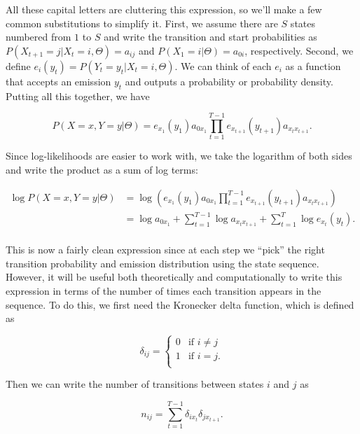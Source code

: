 All these capital letters are cluttering this expression, so we'll make a few common substitutions to simplify it. First, we assume there are $S$ states numbered from $1$ to $S$ and write the transition and start probabilities as $P(X_{t+1}=j|X_t=i, \Theta) = a_{ij}$ and $P(X_1=i|\Theta) = a_{0i}$, respectively. Second, we define $e_i(y_t) = P(Y_t=y_t|X_t=i, \Theta)$. We can think of each $e_i$ as a function that accepts an emission $y_t$ and outputs a probability or probability density. Putting all this together, we have

\begin{equation*}
P(X=x, Y=y|\Theta) = e_{x_1}(y_1)a_{0x_1} \prod_{t=1}^{T-1} e_{x_{t+1}}(y_{t+1}) a_{x_t x_{t+1}}.
\end{equation*}

Since log-likelihoods are easier to work with, we take the logarithm of both sides and write the product as a sum of log terms:

\begin{align*}
\log P(X=x, Y=y|\Theta)
&= \log \left( e_{x_1}(y_1)a_{0x_1} \prod_{t=1}^{T-1} e_{x_{t+1}}(y_{t+1}) a_{x_t x_{t+1}} \right) \\
&= \log a_{0x_1} + \sum_{t=1}^{T-1} \log a_{x_t x_{t+1}} + \sum_{t=1}^T \log e_{x_t}(y_t). \\
\end{align*}

This is now a fairly clean expression since at each step we ``pick'' the right transition probability and emission distribution using the state sequence. However, it will be useful both theoretically and computationally to write this expression in terms of the number of times each transition appears in the sequence. To do this, we first need the Kronecker delta function, which is defined as

\begin{equation*}
\delta_{ij} =
\begin{cases}
    0 &\text{if } i \neq j \\
    1 &\text{if } i=j. \\
\end{cases}
\end{equation*}

Then we can write the number of transitions between states $i$ and $j$ as

\begin{equation*}
n_{ij} = \sum_{t=1}^{T-1} \delta_{ix_t} \delta_{jx_{t+1}}.
\end{equation*}

